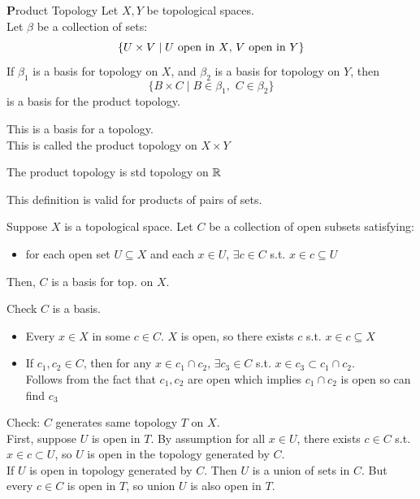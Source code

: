 \begin{example}{\textbf Product Topology}{}
    Let $X,Y$ be topological spaces.\\
    Let $\beta$ be a collection of sets:
    \[\{U \times V \mid U \text{ open in } X\text{, } V \text{ open in } Y\}\]
    If $\beta_1$ is a basis for topology on $X$, and $\beta_2$ is a basis for topology on $Y$, then 
    \[\{B \times C \mid B \in \beta_1,\,\, C\in \beta_2\}\]
    is a basis for the product topology.
\end{example}
\begin{proposition}{}{}
    This is a basis for a topology.\\
    This is called the product topology on $X \times Y$
\end{proposition}
\begin{example*}{}{}
    The product topology is std topology on $\mathbb{R}$
\end{example*}
\noindent This definition is valid for products of pairs of sets.
\begin{lemma}{}{}
    Suppose $X$ is a topological space. Let $C$ be a collection of open subsets satisfying:
    \begin{itemize}
        \item for each open set $U \subseteq X$ and each $x \in U$, $\exists c \in C$ s.t. $x \in c \subseteq U$
    \end{itemize}
    Then, $C$ is a basis for top. on $X$.
\end{lemma}
\begin{lempf}
    Check $C$ is a basis.
    \begin{itemize}
        \item Every $x \in X$ in some $c \in C$. $X$ is open, so there exists $c$ s.t. $x \in c \subseteq X$
        \item If $c_1,c_2 \in C$, then for any $x \in c_1 \cap c_2$, $\exists c_3 \in C$ s.t. $x \in c_3 \subset c_1 \cap c_2$.\\
        Follows from the fact that $c_1,c_2$ are open which implies $c_1 \cap c_2$ is open so can find $c_3$
    \end{itemize}
    Check: $C$ generates same topology $T$ on $X$.\\
    First, suppose $U$ is open in $T$. By assumption for all $x \in U$, there exists $c \in C$ s.t. $x \in c \subset U$,
    so $U$ is open in the topology generated by $C$.\\
    If $U$ is open in topology generated by $C$. Then $U$ is a union of sets in $C$. But every $c \in C$ is open in $T$, so union $U$ is also open in $T$.
\end{lempf}
